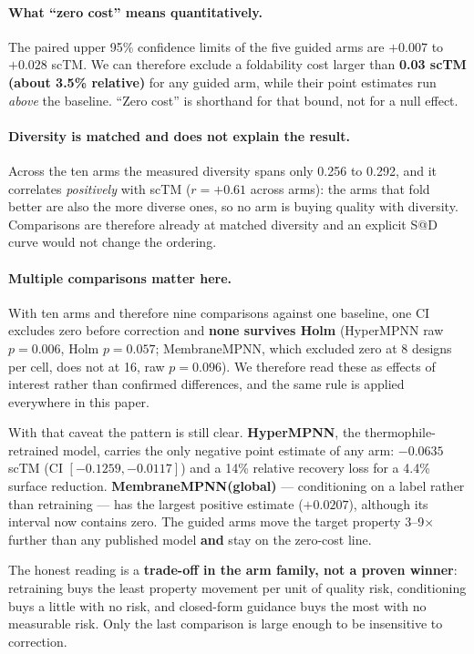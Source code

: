 \paragraph{What ``zero cost'' means quantitatively.}
The paired upper 95\% confidence limits of the five guided arms are $+0.007$ to
$+0.028$ scTM. We can therefore exclude a foldability cost larger than
\textbf{0.03 scTM (about 3.5\% relative)} for any guided arm, while their point
estimates run \emph{above} the baseline. ``Zero cost'' is shorthand for that
bound, not for a null effect.

\paragraph{Diversity is matched and does not explain the result.}
Across the ten arms the measured diversity spans only 0.256 to 0.292, and it
correlates \emph{positively} with scTM ($r = +0.61$ across arms): the arms that
fold better are also the more diverse ones, so no arm is buying quality with
diversity. Comparisons are therefore already at matched diversity and an
explicit S@D curve would not change the ordering.

\paragraph{Multiple comparisons matter here.}
With ten arms and therefore nine comparisons against one baseline, one CI
excludes zero before correction and \textbf{none survives Holm} (HyperMPNN raw
$p = 0.006$, Holm $p = 0.057$; MembraneMPNN, which excluded zero at 8 designs per
cell, does not at 16, raw $p = 0.096$). We therefore read these as effects of
interest rather than confirmed differences, and the same rule is applied
everywhere in this paper.

With that caveat the pattern is still clear. \textbf{HyperMPNN}, the thermophile-retrained model, carries the only negative point estimate of any arm:
$\bm{-0.0635}$ scTM (CI $[-0.1259, -0.0117]$) and a 14\% relative recovery loss
for a 4.4\% surface reduction. \textbf{MembraneMPNN(global)} --- conditioning on
a label rather than retraining --- has the largest positive estimate
($+0.0207$), although its interval now contains zero.
The guided arms move the target property 3--9$\times$ further than any published
model \textbf{and} stay on the zero-cost line.

The honest reading is a \textbf{trade-off in the arm family, not a proven
winner}: retraining buys the least property movement per unit of quality risk,
conditioning buys a little with no risk, and closed-form guidance buys the most
with no measurable risk. Only the last comparison is large enough to be
insensitive to correction.

